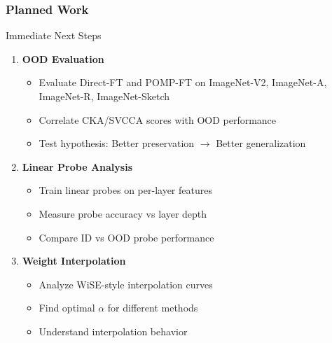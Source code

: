 \documentclass[aspectratio=1610, fontsize=8pt]{beamer}
\begin{document}
\begin{frame}
    \frametitle{Planned Work}
    \begin{block}{Immediate Next Steps}
        \begin{enumerate}
            \item \textbf{OOD Evaluation}
            \begin{itemize}
                \item Evaluate Direct-FT and POMP-FT on ImageNet-V2, ImageNet-A, ImageNet-R, ImageNet-Sketch
                \item Correlate CKA/SVCCA scores with OOD performance
                \item Test hypothesis: Better preservation $\rightarrow$ Better generalization
            \end{itemize}
            
            \item \textbf{Linear Probe Analysis}
            \begin{itemize}
                \item Train linear probes on per-layer features
                \item Measure probe accuracy vs layer depth
                \item Compare ID vs OOD probe performance
            \end{itemize}
            
            \item \textbf{Weight Interpolation}
            \begin{itemize}
                \item Analyze WiSE-style interpolation curves
                \item Find optimal $\alpha$ for different methods
                \item Understand interpolation behavior
            \end{itemize}
        \end{enumerate}
    \end{block}
\end{frame}
\end{document}
